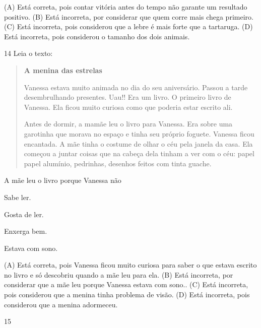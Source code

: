
(A) Está correta, pois contar vitória antes do tempo não garante um resultado positivo.
(B) Está incorreta, por considerar que quem corre mais chega primeiro.
(C) Está incorreta, pois considerou que a lebre é mais forte que a tartaruga.
(D) Está incorreta, pois considerou o tamanho dos dois animais.

\num{14} Leia o texto:

\begin{quote}
\textbf{A menina das estrelas}

Vanessa estava muito animada no dia do seu aniversário. Passou a tarde
desembrulhando presentes. Uau!! Era um livro. O primeiro livro de
Vanessa. Ela ficou muito curiosa como que poderia estar escrito ali.

Antes de dormir, a mamãe leu o livro para Vanessa. Era sobre uma
garotinha que morava no espaço e tinha seu próprio foguete. Vanessa
ficou encantada. A mãe tinha o costume de olhar o céu pela janela da
casa. Ela começou a juntar coisas que na cabeça dela tinham a ver com o
céu: papel papel alumínio, pedrinhas, desenhos feitos com tinta guache.
\end{quote}


A mãe leu o livro porque Vanessa não

\begin{escolha}
\item Sabe ler.

\item Gosta de ler.

\item Enxerga bem.

\item Estava com sono.
\end{escolha}


(A) Está correta, pois Vanessa ficou muito curiosa para saber o que
estava escrito no livro e só descobriu quando a mãe leu para ela.
(B) Está incorreta, por considerar que a mãe leu porque Vanessa estava
com sono..
(C) Está incorreta, pois considerou que a menina tinha problema de visão.
(D) Está incorreta, pois considerou que a menina adormeceu.

\num{15}

